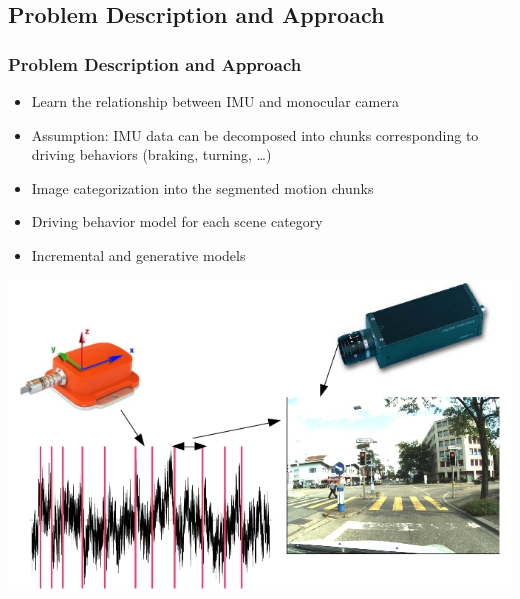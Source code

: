 \documentclass{beamer}
\begin{document}
\subsection{Problem Description and Approach}
\begin{frame}[t]
  \frametitle{Problem Description and Approach}
  \begin{itemize}
    \item Learn the relationship between IMU and monocular camera
    \item Assumption: IMU data can be decomposed into chunks corresponding
      to driving behaviors (braking, turning, \dots)
    \item Image categorization into the segmented motion chunks
    \item Driving behavior model for each scene category
    \item Incremental and generative models
  \end{itemize}
  \begin{center}
    \includegraphics[scale=0.2]{figures/overview}
  \end{center}
\end{frame}
\end{document}
